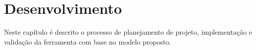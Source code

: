 \chapter{Desenvolvimento}

Neste capítulo é descrito o processo de planejamento de projeto, implementação e validação da ferramenta com base no modelo proposto.



